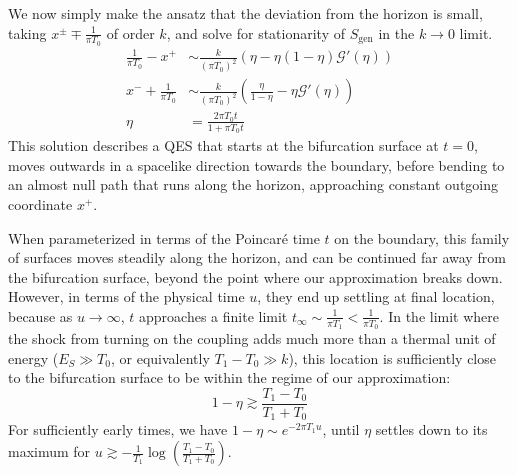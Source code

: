 \documentclass[12pt]{article}
\begin{document}
We now simply make the ansatz that the deviation from the horizon is small, taking $x^\pm \mp \frac{1}{\pi T_0}$ of order $k$, and solve for stationarity of $S_\text{gen}$ in the $k\to 0$ limit.
\begin{align}
	\frac{1}{\pi T_0}-x^+ &\sim \frac{k}{(\pi T_0)^2}(\eta-\eta(1-\eta) \mathcal{G}'(\eta))\\
	 x^-+\frac{1}{\pi T_0} &\sim \frac{k}{(\pi T_0)^2} \left(\frac{\eta}{1-\eta}-\eta \mathcal{G}'(\eta)\right) \\
	  \eta &=\frac{2\pi T_0 t}{1+\pi T_0 t}
\end{align}
This solution describes a QES that starts at the bifurcation surface at $t=0$, moves outwards in a spacelike direction towards the boundary, before bending to an almost null path that runs along the horizon, approaching constant outgoing coordinate $x^+$.

When parameterized in terms of the Poincar\'e time $t$ on the boundary, this family of surfaces moves steadily along the horizon, and can be continued far away from the bifurcation surface, beyond the point where our approximation breaks down. However, in terms of the physical time $u$, they end up settling at final location, because as $u\to\infty$, $t$ approaches a finite limit $t_\infty\sim \frac{1}{\pi T_1}<\frac{1}{\pi T_0}$. In the limit where the shock from turning on the coupling adds much more than a thermal unit of energy ($E_S\gg T_0$, or equivalently $T_1-T_0 \gg k$), this location is sufficiently close to the bifurcation surface to be within the regime of our approximation:
\begin{equation}
	1-\eta \gtrsim \frac{T_1-T_0}{T_1+T_0}
\end{equation}
For sufficiently early times, we have $1-\eta \sim e^{-2\pi T_1 u}$, until $\eta$ settles down to its maximum for $u\gtrsim -\frac{1}{T_1}\log\left(\frac{T_1-T_0}{T_1+T_0}\right)$.
\end{document}
